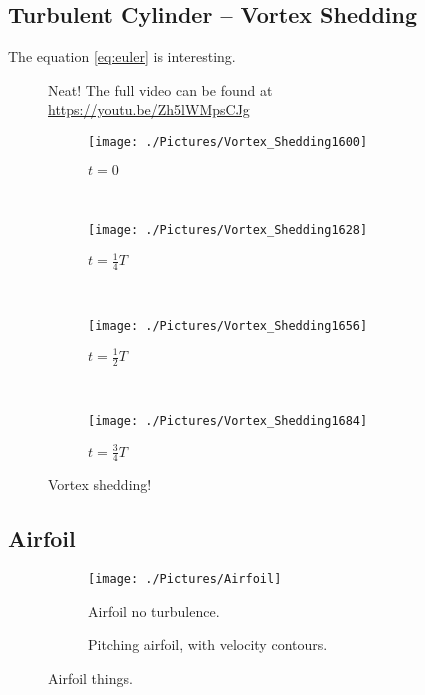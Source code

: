 \documentclass[10pt, titlepage]{article}
\begin{document}
\subsection{Turbulent Cylinder -- Vortex Shedding}

The equation \eqref{eq:euler} is interesting.

\begin{figure}[htb]
\centering
{}
\caption[Vortex Shedding Animation]{Neat! The full video can be found at \url{https://youtu.be/Zh5lWMpsCJg}}
\label{vortexanimation}
\end{figure}

\lipsum[1-2]

\begin{figure}
\begin{subfigure}{\linewidth}
  \centering
  \texttt{[image: ./Pictures/Vortex\_Shedding1600]}
  \caption{$t = 0$}
\end{subfigure} \\
\begin{subfigure}{\textwidth}
  \centering
  \texttt{[image: ./Pictures/Vortex\_Shedding1628]}
  \caption{$t = \frac{1}{4}T$}
\end{subfigure} \\
\begin{subfigure}{\linewidth}
  \centering
  \texttt{[image: ./Pictures/Vortex\_Shedding1656]}
  \caption{$t = \frac{1}{2}T$}
\end{subfigure} \\
\begin{subfigure}{\textwidth}
  \centering
  \texttt{[image: ./Pictures/Vortex\_Shedding1684]}
  \caption{$t = \frac{3}{4}T$}
\end{subfigure}
\caption[Vortex Shedding at $\frac{1}{4}T$ increments]{Vortex shedding!}
\label{fig:vortexshedding}
\end{figure}

\subsection{Airfoil}
\lipsum[4-7]

\begin{figure}
\begin{subfigure}{0.5\linewidth}
\centering
\texttt{[image: ./Pictures/Airfoil]}
\caption{Airfoil no turbulence.}
\label{airfoil}
\end{subfigure}
\begin{subfigure}{0.5\textwidth}
\centering
{}
\caption{Pitching airfoil, with velocity contours.}
\label{fig:airfoilanimation}
\end{subfigure}
\caption[Turbulent Airfoil Animation, and Laminar Airfoil Streamlines]{Airfoil things.}
\end{figure}
\end{document}
